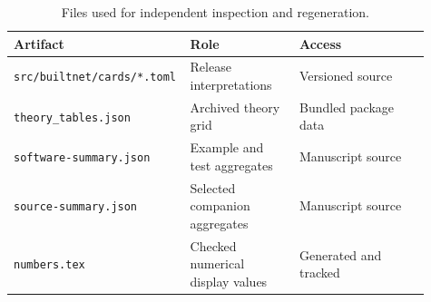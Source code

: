 \begin{table}[!htbp]
\centering\small
\caption{Files used for independent inspection and regeneration.}
\label{tab:release-artifacts}
\begin{tabular}{@{} >{\raggedright\arraybackslash}p{0.34\linewidth} >{\raggedright\arraybackslash}p{0.26\linewidth} >{\raggedright\arraybackslash}p{0.31\linewidth} @{}}
\toprule
\rowcolor{tableblue} \textbf{Artifact} & \textbf{Role} & \textbf{Access} \\
\midrule
\texttt{src/builtnet/cards/*.toml} & Release interpretations & Versioned source \\
\texttt{theory\_tables.json} & Archived theory grid & Bundled package data \\
\texttt{software-summary.json} & Example and test aggregates & Manuscript source \\
\texttt{source-summary.json} & Selected companion aggregates & Manuscript source \\
\texttt{numbers.tex} & Checked numerical display values & Generated and tracked \\
\bottomrule
\end{tabular}
\end{table}
